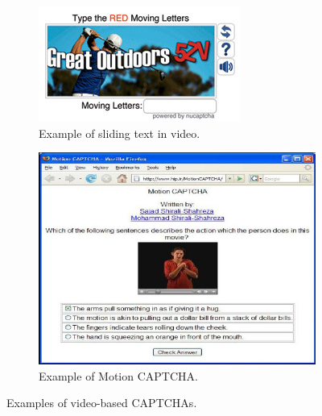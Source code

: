 \begin{figure}[h]
     \centering
     \begin{subfigure}[b]{0.48\textwidth}
         \centering
         \includegraphics[width=\linewidth]{Images/StateOfArt/video_CAPTCHA}
         \caption{\footnotesize{Example of sliding text in video.}}
         \label{soa:video}
     \end{subfigure}
     \hfill
     \begin{subfigure}[b]{0.48\textwidth}
         \centering
         \includegraphics[width=\linewidth]{Images/StateOfArt/video_CAPTCHA2}
         \caption{\footnotesize{Example of Motion CAPTCHA\cite{Motion_CAPTCHA}.}}
        \label{soa:video2}
     \end{subfigure}
     \caption{\footnotesize{Examples of video-based CAPTCHAs.}}
\end{figure}

